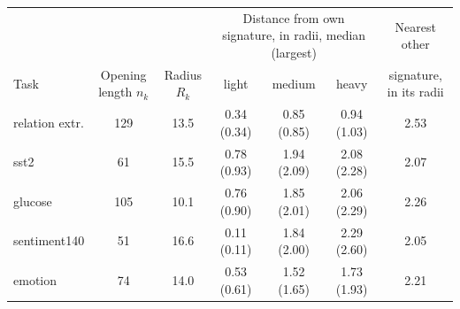 \setlength{\tabcolsep}{2pt}%
\begin{tabular}{lcccccc}
    \toprule
    & & & \multicolumn{3}{c}{Distance from own signature, in radii, median (largest)} & Nearest other \\
    \cmidrule(lr){4-6}
    Task & \shortstack[c]{Opening\\length\\$n_k$} & \shortstack[c]{Radius\\$R_k$} & light & medium & heavy & signature, in its radii \\
    \midrule
    relation extr. & 129 & 13.5 & 0.34 (0.34) & 0.85 (0.85) & 0.94 (1.03) & 2.53 \\
    sst2 & 61 & 15.5 & 0.78 (0.93) & 1.94 (2.09) & 2.08 (2.28) & 2.07 \\
    glucose & 105 & 10.1 & 0.76 (0.90) & 1.85 (2.01) & 2.06 (2.29) & 2.26 \\
    sentiment140 & 51 & 16.6 & 0.11 (0.11) & 1.84 (2.00) & 2.29 (2.60) & 2.05 \\
    emotion & 74 & 14.0 & 0.53 (0.61) & 1.52 (1.65) & 1.73 (1.93) & 2.21 \\
    \bottomrule
\end{tabular}
